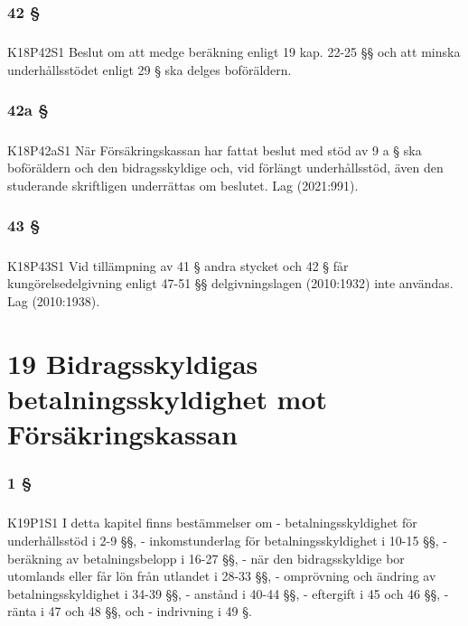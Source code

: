 \documentclass[a4paper,notitlepage,openany,10pt]{book}
\begin{document}
\subsection*{42 §}
\paragraph*{}
{\tiny K18P42S1}
Beslut om att medge beräkning enligt 19 kap. 22-25 §§ och att minska underhållsstödet enligt 29 § ska delges boföräldern.
\subsection*{42a §}
\paragraph*{}
{\tiny K18P42aS1}
När Försäkringskassan har fattat beslut med stöd av 9 a § ska boföräldern och den bidragsskyldige och, vid förlängt underhållsstöd, även den studerande skriftligen underrättas om beslutet.
Lag (2021:991).
\subsection*{43 §}
\paragraph*{}
{\tiny K18P43S1}
Vid tillämpning av 41 § andra stycket och 42 § får kungörelsedelgivning enligt 47-51 §§ delgivningslagen (2010:1932) inte användas.
Lag (2010:1938).
\chapter*{19 Bidragsskyldigas betalningsskyldighet mot Försäkringskassan}
\subsection*{1 §}
\paragraph*{}
{\tiny K19P1S1}
I detta kapitel finns bestämmelser om
\newline - betalningsskyldighet för underhållsstöd i 2-9 §§,
\newline - inkomstunderlag för betalningsskyldighet i 10-15 §§, - beräkning av betalningsbelopp i 16-27 §§,
\newline - när den bidragsskyldige bor utomlands eller får lön från utlandet i 28-33 §§,
\newline - omprövning och ändring av betalningsskyldighet i 34-39 §§, - anstånd i 40-44 §§,
\newline - eftergift i 45 och 46 §§,
\newline - ränta i 47 och 48 §§, och
\newline - indrivning i 49 §.
\end{document}
